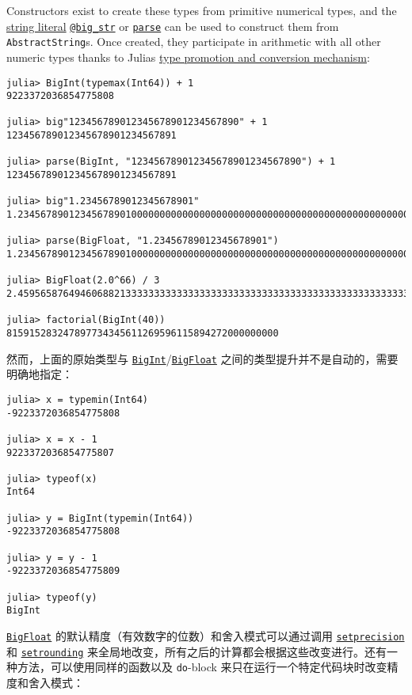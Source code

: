Constructors exist to create these types from primitive numerical types, and the \href{@ref non-standard-string-literals}{string literal} \hyperlink{4226571565562941917}{\texttt{@big\_str}} or \hyperlink{14207407853646164654}{\texttt{parse}} can be used to construct them from \texttt{AbstractString}s.  Once created, they participate in arithmetic with all other numeric types thanks to Julia{\textquotesingle}s \hyperlink{10374023657104680331}{type promotion and conversion mechanism}:




\begin{verbatim}
julia> BigInt(typemax(Int64)) + 1
9223372036854775808

julia> big"123456789012345678901234567890" + 1
123456789012345678901234567891

julia> parse(BigInt, "123456789012345678901234567890") + 1
123456789012345678901234567891

julia> big"1.23456789012345678901"
1.234567890123456789010000000000000000000000000000000000000000000000000000000004

julia> parse(BigFloat, "1.23456789012345678901")
1.234567890123456789010000000000000000000000000000000000000000000000000000000004

julia> BigFloat(2.0^66) / 3
2.459565876494606882133333333333333333333333333333333333333333333333333333333344e+19

julia> factorial(BigInt(40))
815915283247897734345611269596115894272000000000
\end{verbatim}



然而，上面的原始类型与 \hyperlink{423405808990690832}{\texttt{BigInt}}/\hyperlink{749816618809421837}{\texttt{BigFloat}} 之间的类型提升并不是自动的，需要明确地指定：




\begin{verbatim}
julia> x = typemin(Int64)
-9223372036854775808

julia> x = x - 1
9223372036854775807

julia> typeof(x)
Int64

julia> y = BigInt(typemin(Int64))
-9223372036854775808

julia> y = y - 1
-9223372036854775809

julia> typeof(y)
BigInt
\end{verbatim}



\hyperlink{749816618809421837}{\texttt{BigFloat}} 的默认精度（有效数字的位数）和舍入模式可以通过调用 \hyperlink{3543074496498234209}{\texttt{setprecision}} 和 \hyperlink{12025922235501343815}{\texttt{setrounding}} 来全局地改变，所有之后的计算都会根据这些改变进行。还有一种方法，可以使用同样的函数以及 \texttt{do}-block 来只在运行一个特定代码块时改变精度和舍入模式：




